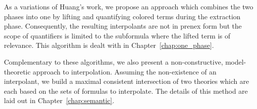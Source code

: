 

As a variations of Huang's work, we propose an approach which combines the two phases into one 
by lifting and quantifying colored terms during the extraction phase. 
Consequently, the resulting interpolants are not in prenex form but the scope of quantifiers is limited to the subformula where the lifted term is of relevance.
This algorithm is dealt with in Chapter~\ref{chap:one_phase}.

Complementary to these algorithms, we also present a non-constructive, model-theoretic approach to interpolation.
Assuming the non-existence of an interpolant, we build a maximal consistent intersection of two theories which are each based on the sets of formulas to interpolate. The details of this method are laid out in Chapter~\ref{chap:semantic}.



